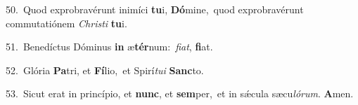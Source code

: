 {\numbfont\textcolor{\numbcolor}{50.}}~Quod exprobravérunt inimíci \textbf{tu}\-i, \textbf{Dó}\-mine,~\star quod exprobravérunt commutatiónem \textit{Chris}\-\textit{ti} \textbf{tu}\-i.\par
{\numbfont\textcolor{\numbcolor}{51.}}~Benedíctus Dóminus \textbf{in} æ\-\textbf{tér}\-num:~\star \textit{fi}\-\textit{at}, \textbf{fi}\-at.\par
{\numbfont\textcolor{\numbcolor}{52.}}~Glória \textbf{Pa}\-tri, et \textbf{Fí}\-lio,~\star et Spirí\-\textit{tu}\-\textit{i} \textbf{Sanc}\-to.\par
{\numbfont\textcolor{\numbcolor}{53.}}~Sicut erat in princípio, et \textbf{nunc}\-, et \textbf{sem}\-per,~\star et in sǽcula sæcu\-\textit{ló}\-\textit{rum}. \textbf{A}\-men.\par
